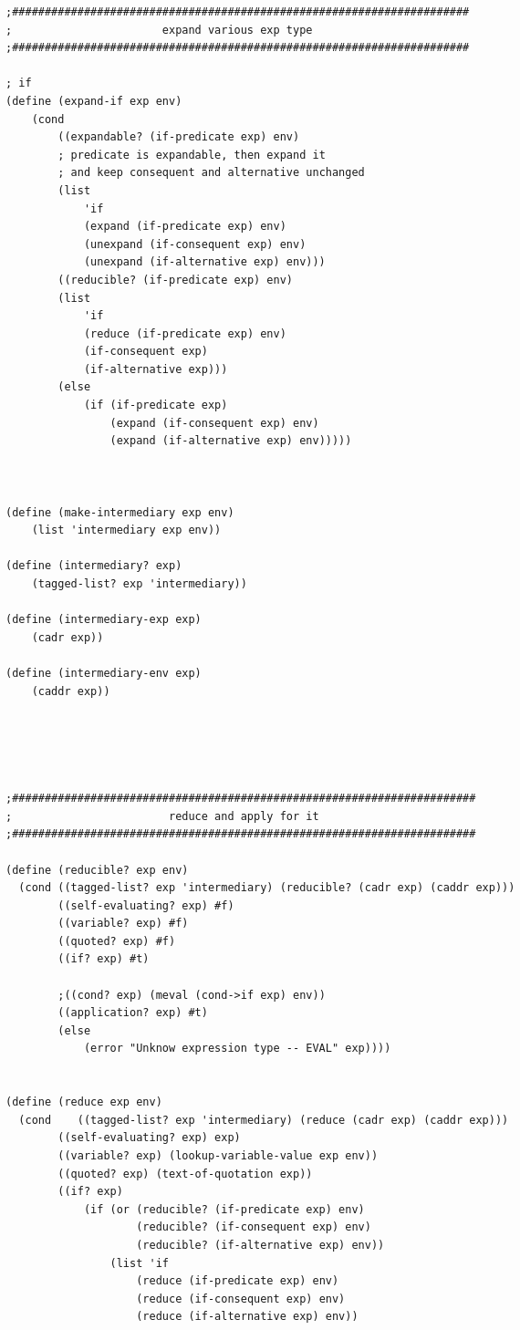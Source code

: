 \documentclass{article}
\begin{document}
\begin{CJK*}{UTF8}{gkai}
\begin{lstlisting}[basicstyle=\scriptsize\ttfamily\bfseries]
;######################################################################
;                       expand various exp type
;######################################################################

; if 
(define (expand-if exp env)
    (cond 
        ((expandable? (if-predicate exp) env)
        ; predicate is expandable, then expand it 
        ; and keep consequent and alternative unchanged
        (list 
            'if
            (expand (if-predicate exp) env)
            (unexpand (if-consequent exp) env)
            (unexpand (if-alternative exp) env)))
        ((reducible? (if-predicate exp) env)
        (list 
            'if
            (reduce (if-predicate exp) env)
            (if-consequent exp)
            (if-alternative exp)))
        (else
            (if (if-predicate exp)
                (expand (if-consequent exp) env)
                (expand (if-alternative exp) env)))))



(define (make-intermediary exp env)
    (list 'intermediary exp env))

(define (intermediary? exp)
    (tagged-list? exp 'intermediary))

(define (intermediary-exp exp)
    (cadr exp))

(define (intermediary-env exp)
    (caddr exp))





;#######################################################################
;                        reduce and apply for it
;#######################################################################

(define (reducible? exp env)
  (cond ((tagged-list? exp 'intermediary) (reducible? (cadr exp) (caddr exp)))
        ((self-evaluating? exp) #f)
        ((variable? exp) #f)
        ((quoted? exp) #f)
        ((if? exp) #t)

        ;((cond? exp) (meval (cond->if exp) env))
        ((application? exp) #t)
        (else
            (error "Unknow expression type -- EVAL" exp))))


(define (reduce exp env)
  (cond    ((tagged-list? exp 'intermediary) (reduce (cadr exp) (caddr exp)))
        ((self-evaluating? exp) exp)
        ((variable? exp) (lookup-variable-value exp env))
        ((quoted? exp) (text-of-quotation exp))
        ((if? exp)
            (if (or (reducible? (if-predicate exp) env)
                    (reducible? (if-consequent exp) env)
                    (reducible? (if-alternative exp) env))
                (list 'if 
                    (reduce (if-predicate exp) env)
                    (reduce (if-consequent exp) env)
                    (reduce (if-alternative exp) env))
                

\end{lstlisting}
\end{CJK*}
\end{document}

